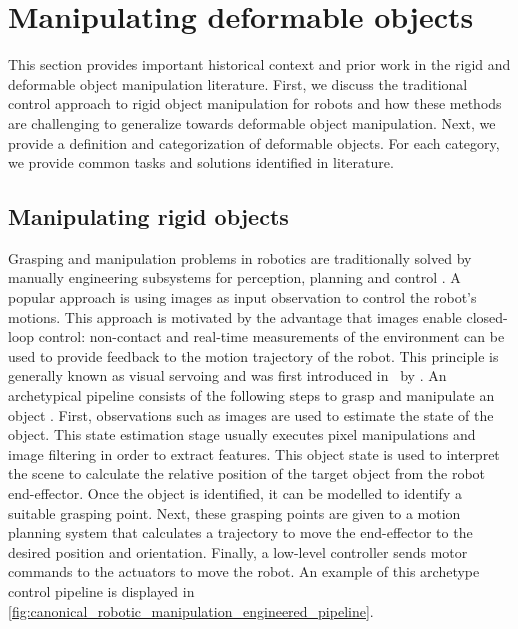 \section{Manipulating deformable objects} \label{sec:lit_traditional}

This section provides important historical context and prior work in the rigid and deformable object manipulation literature. First, we discuss the traditional control approach to rigid object manipulation for robots and how these methods are challenging to generalize towards deformable object manipulation. Next, we provide a definition and categorization of deformable objects. For each category, we provide common tasks and solutions identified in literature.

\subsection{Manipulating rigid objects}
Grasping and manipulation problems in robotics are traditionally solved by manually engineering subsystems for perception, planning and control \autocite{Siciliano2008}. A popular approach is using images as input observation to control the robot's motions. This approach is motivated by the advantage that images enable closed-loop control: non-contact and real-time measurements of the environment can be used to provide feedback to the motion trajectory of the robot. This principle is generally known as visual servoing \autocite{Hutchinson1996} and was first introduced in~\citeyear{Hill1979} by \textcite{Hill1979}. An archetypical pipeline consists of the following steps to grasp and manipulate an object \autocite{Corke1996}. First, observations such as images are used to estimate the state of the object. This state estimation stage usually executes pixel manipulations and image filtering in order to extract features. This object state is used to interpret the scene to calculate the relative position of the target object from the robot end-effector. Once the object is identified, it can be modelled to identify a suitable grasping point. Next, these grasping points are given to a motion planning system that calculates a trajectory to move the end-effector to the desired position and orientation. Finally, a low-level controller sends motor commands to the actuators to move the robot. An example of this archetype control pipeline is displayed in \cref{fig:canonical_robotic_manipulation_engineered_pipeline}.

